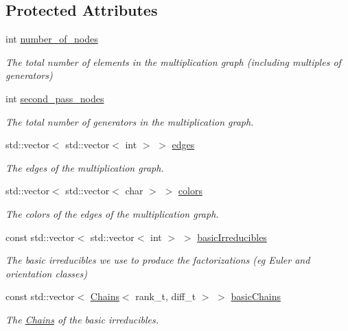 \subsection*{Protected Attributes}
\begin{DoxyCompactItemize}
\item 
int \hyperlink{classMackey_1_1MultiplicationTable_a224de8ffa6d10b7d9511880bb8a2260f}{number\+\_\+of\+\_\+nodes}
\begin{DoxyCompactList}\small\item\em The total number of elements in the multiplication graph (including multiples of generators) \end{DoxyCompactList}\item 
int \hyperlink{classMackey_1_1MultiplicationTable_a0c2fa316e3b79691a73a69e552a52bfc}{second\+\_\+pass\+\_\+nodes}
\begin{DoxyCompactList}\small\item\em The total number of generators in the multiplication graph. \end{DoxyCompactList}\item 
std\+::vector$<$ std\+::vector$<$ int $>$ $>$ \hyperlink{classMackey_1_1MultiplicationTable_a3e1f526da86649b8a41465d27395d04b}{edges}
\begin{DoxyCompactList}\small\item\em The edges of the multiplication graph. \end{DoxyCompactList}\item 
std\+::vector$<$ std\+::vector$<$ char $>$ $>$ \hyperlink{classMackey_1_1MultiplicationTable_a11dcad2d104dfd310c8d3439fa00a4ce}{colors}
\begin{DoxyCompactList}\small\item\em The colors of the edges of the multiplication graph. \end{DoxyCompactList}\item 
const std\+::vector$<$ std\+::vector$<$ int $>$ $>$ \hyperlink{classMackey_1_1MultiplicationTable_ae24bff3ca169d3f9584f6bf7dcb390b1}{basic\+Irreducibles}
\begin{DoxyCompactList}\small\item\em The basic irreducibles we use to produce the factorizations (eg Euler and orientation classes) \end{DoxyCompactList}\item 
const std\+::vector$<$ \hyperlink{classMackey_1_1Chains}{Chains}$<$ rank\+\_\+t, diff\+\_\+t $>$ $>$ \hyperlink{classMackey_1_1MultiplicationTable_a2072078bd506c1b8f8aa80044af159ec}{basic\+Chains}
\begin{DoxyCompactList}\small\item\em The \hyperlink{classMackey_1_1Chains}{Chains} of the basic irreducibles. \end{DoxyCompactList}\end{DoxyCompactItemize}


